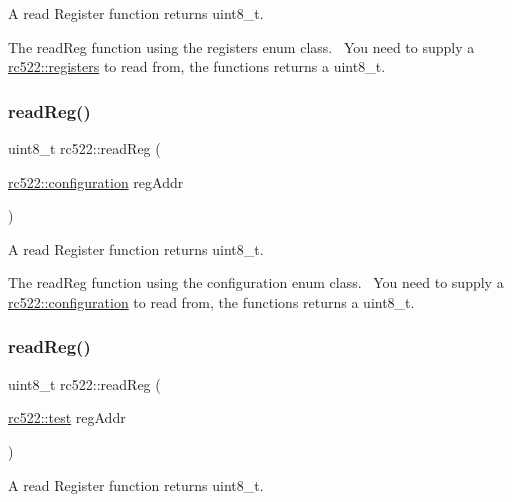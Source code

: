 A read Register function returns uint8\+\_\+t. 

The read\+Reg function using the registers enum class.~\newline
You need to supply a \hyperlink{classrc522_a83057db5f8fefa3dc9a6e8e5f0e191ee}{rc522\+::registers} to read from, the functions returns a uint8\+\_\+t. \mbox{\label{classrc522_a96857ef5f6e2a9b4bc7e6901f65907b5}} 
\subsubsection{\texorpdfstring{read\+Reg()}{readReg()}\hspace{0.1cm}{\footnotesize\ttfamily [3/4]}}
{\footnotesize\ttfamily uint8\+\_\+t rc522\+::read\+Reg (\begin{DoxyParamCaption}\item[{\hyperlink{classrc522_afcf27c8198d017cd4e8173c7d7a6fded}{rc522\+::configuration}}]{reg\+Addr }\end{DoxyParamCaption})}



A read Register function returns uint8\+\_\+t. 

The read\+Reg function using the configuration enum class.~\newline
You need to supply a \hyperlink{classrc522_afcf27c8198d017cd4e8173c7d7a6fded}{rc522\+::configuration} to read from, the functions returns a uint8\+\_\+t. \mbox{\label{classrc522_a1b5a8b96bae53a3832e10054211f5064}} 
\subsubsection{\texorpdfstring{read\+Reg()}{readReg()}\hspace{0.1cm}{\footnotesize\ttfamily [4/4]}}
{\footnotesize\ttfamily uint8\+\_\+t rc522\+::read\+Reg (\begin{DoxyParamCaption}\item[{\hyperlink{classrc522_a9589917c9bbcd18ea9c7d86c7ec565bd}{rc522\+::test}}]{reg\+Addr }\end{DoxyParamCaption})}



A read Register function returns uint8\+\_\+t. 

